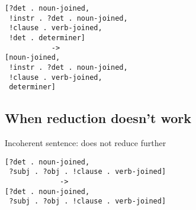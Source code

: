 \documentclass{article}
\begin{document}
\begin{lstlisting}
[?det . noun-joined,
 !instr . ?det . noun-joined,
 !clause . verb-joined,
 !det . determiner]
           ->
[noun-joined,
 !instr . ?det . noun-joined,
 !clause . verb-joined,
 determiner]
\end{lstlisting}


\subsection{When reduction doesn't work}
    
Incoherent sentence: does not reduce further

\begin{lstlisting}
[?det . noun-joined,
 ?subj . ?obj . !clause . verb-joined]
             ->
[?det . noun-joined,
 ?subj . ?obj . !clause . verb-joined]
\end{lstlisting}
\end{document}
